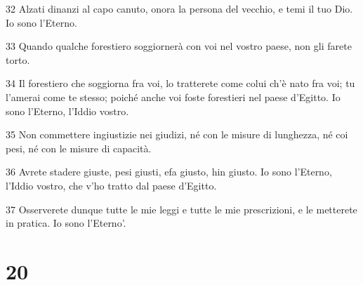 \par 32 Alzati dinanzi al capo canuto, onora la persona del vecchio, e temi il tuo Dio. Io sono l'Eterno.
\par 33 Quando qualche forestiero soggiornerà con voi nel vostro paese, non gli farete torto.
\par 34 Il forestiero che soggiorna fra voi, lo tratterete come colui ch'è nato fra voi; tu l'amerai come te stesso; poiché anche voi foste forestieri nel paese d'Egitto. Io sono l'Eterno, l'Iddio vostro.
\par 35 Non commettere ingiustizie nei giudizi, né con le misure di lunghezza, né coi pesi, né con le misure di capacità.
\par 36 Avrete stadere giuste, pesi giusti, efa giusto, hin giusto. Io sono l'Eterno, l'Iddio vostro, che v'ho tratto dal paese d'Egitto.
\par 37 Osserverete dunque tutte le mie leggi e tutte le mie prescrizioni, e le metterete in pratica. Io sono l'Eterno'.

\chapter{20}


